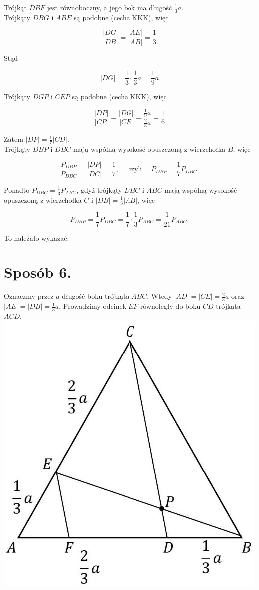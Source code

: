 \documentclass[10pt]{article}
\begin{document}
Trójkąt $D B F$ jest równoboczny, a jego bok ma długość $\frac{1}{3} a$.\\
Trójkąty $D B G$ i $A B E$ są podobne (cecha KKK), więc

$$
\frac{|D G|}{|D B|}=\frac{|A E|}{|A B|}=\frac{1}{3}
$$

Stąd

$$
|D G|=\frac{1}{3} \cdot \frac{1}{3} a=\frac{1}{9} a
$$

Trójkąty $D G P$ i $C E P$ są podobne (cecha KKK), więc

$$
\frac{|D P|}{|C P|}=\frac{|D G|}{|C E|}=\frac{\frac{1}{9} a}{\frac{2}{3} a}=\frac{1}{6}
$$

Zatem $|D P|=\frac{1}{7}|C D|$.\\
Trójkąty $D B P$ i $D B C$ mają wspólną wysokość opuszczoną z wierzchołka $B$, więc

$$
\frac{P_{D B P}}{P_{D B C}}=\frac{|D P|}{|D C|}=\frac{1}{7}, \quad \text { czyli } \quad P_{D B P}=\frac{1}{7} P_{D B C} .
$$

Ponadto $P_{D B C}=\frac{1}{3} P_{A B C}$, gdyż trójkąty $D B C$ i $A B C$ mają wspólną wysokość opuszczoną z wierzchołka $C$ i $|D B|=\frac{1}{3}|A B|$, więc

$$
P_{D B P}=\frac{1}{7} P_{D B C}=\frac{1}{7} \cdot \frac{1}{3} P_{A B C}=\frac{1}{21} P_{A B C} .
$$

To należało wykazać.

\section*{Sposób 6.}
Oznaczmy przez $a$ długość boku trójkąta $A B C$. Wtedy $|A D|=|C E|=\frac{2}{3} a$ oraz $|A E|=|D B|=\frac{1}{3} a$. Prowadzimy odcinek $E F$ równoległy do boku $C D$ trójkąta $A C D$.\\
\includegraphics[max width=\textwidth, center]{2025_02_07_36131546116d12814c9cg-16}
\end{document}
